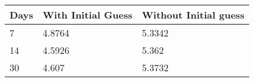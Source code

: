 \begin{tabular}{lll}
Days & With Initial Guess & Without Initial guess \\ 
\hline 
7 & 4.8764 & 5.3342 \\ 
14 & 4.5926 & 5.362 \\ 
30 & 4.607 & 5.3732 \\ 
\hline 
\end{tabular}